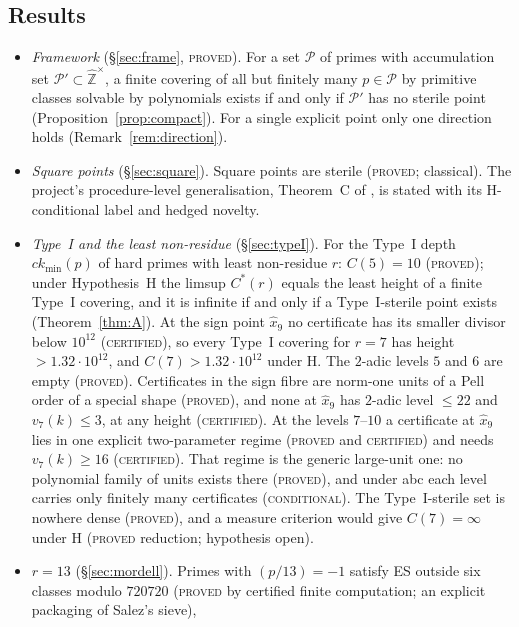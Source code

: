 \documentclass[11pt,reqno]{amsart}
\theoremstyle{definition}
\newcommand{\Z}{\mathbb Z}
\newcommand{\Zhu}{\widehat{\Z}^{\times}}
\newcommand{\ckmin}{ck_{\min}}
\newcommand{\status}[1]{\textup{\textsc{#1}}}
\begin{document}
\subsection*{Results}
\begin{itemize}
\item \emph{Framework} (\S\ref{sec:frame}, \status{proved}).  For a set
$\mathcal P$ of primes with accumulation set $\mathcal P'\subset\Zhu$, a
finite covering of all but finitely many $p\in\mathcal P$ by primitive
classes solvable by polynomials exists if and only if $\mathcal P'$ has
no sterile point (Proposition~\ref{prop:compact}).  For a single explicit
point only one direction holds (Remark~\ref{rem:direction}).
\item \emph{Square points} (\S\ref{sec:square}).  Square points are
sterile (\status{proved}; classical).  The project's procedure-level
generalisation, Theorem~C of \cite{PS}, is stated with its
H-conditional label and hedged novelty.
\item \emph{Type~I and the least non-residue} (\S\ref{sec:typeI}).  For
the Type~I depth $\ckmin(p)$ of hard primes with least non-residue $r$:
$C(5)=10$ (\status{proved}); under Hypothesis~H the limsup $C^*(r)$
equals the least height of a finite Type~I covering, and it is infinite
if and only if a Type~I-sterile point exists (Theorem~\ref{thm:A}).  At
the sign point $\hat x_9$ no certificate has its smaller divisor below
$10^{12}$ (\status{certified}), so every Type~I covering for $r=7$ has
height $>1.32\cdot10^{12}$, and $C(7)>1.32\cdot10^{12}$ under H.  The
$2$-adic levels $5$ and $6$ are empty (\status{proved}).  Certificates in
the sign fibre are norm-one units of a Pell order of a special shape
(\status{proved}), and none at $\hat x_9$ has $2$-adic level $\le22$ and
$v_7(k)\le3$, at any height (\status{certified}).  At the levels $7$--$10$
a certificate at $\hat x_9$ lies in one explicit two-parameter regime
(\status{proved} and \status{certified}) and needs $v_7(k)\ge16$
(\status{certified}).  That regime is the generic large-unit one: no
polynomial family of units exists there (\status{proved}), and under abc
each level carries only finitely many certificates
(\status{conditional}).  The Type~I-sterile
set is nowhere dense (\status{proved}), and a measure criterion would give
$C(7)=\infty$ under H (\status{proved} reduction; hypothesis open).
\item \emph{$r=13$} (\S\ref{sec:mordell}).  Primes with $(p/13)=-1$
satisfy ES outside six classes modulo $720720$ (\status{proved} by
certified finite computation; an explicit packaging of Salez's sieve),

\end{itemize}
\end{document}
